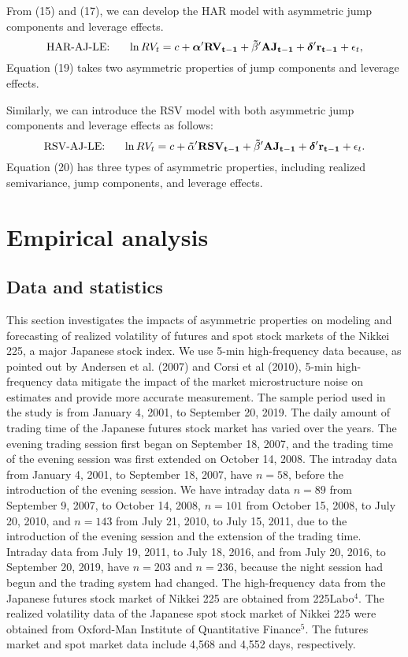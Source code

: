 \documentclass[10pt]{article}
\begin{document}
From (15) and (17), we can develop the HAR model with asymmetric jump components and leverage effects. 
\begin{equation}
\text{HAR-AJ-LE:} \ \ \ \ \ \ln RV_t=c+{\boldsymbol  \alpha}^{\prime} {\bf RV_{t-1}} +{\boldsymbol \tilde{\beta}}^{\prime} {\bf AJ_{t-1}} + {\boldsymbol  \delta}^{\prime} {\bf r_{t-1}} +\epsilon_t,
\end{equation}
Equation (19) takes two asymmetric properties of jump components and leverage effects.

Similarly, we can introduce the RSV model with both asymmetric jump components and leverage effects as follows: 
\begin{equation}
\text{RSV-AJ-LE:} \ \ \ \ \ \ln RV_t=c+{\boldsymbol  \tilde{\alpha}}^{\prime} {\bf RSV_{t-1}} + {\boldsymbol  \tilde{\beta}}^{\prime} {\bf AJ_{t-1}}+{\boldsymbol  \delta}^{\prime} {\bf r_{t-1}} +\epsilon_t. 
\end{equation}
Equation (20) has three types of asymmetric properties, including realized semivariance, jump components, and leverage effects. 


\section{Empirical analysis}

\subsection{Data and statistics}
This section investigates the impacts of asymmetric properties on modeling and forecasting of realized volatility of futures and spot stock markets of the Nikkei 225, a major Japanese stock index. 
We use 5-min high-frequency data 
because, as pointed out by Andersen et al. (2007) and Corsi et al (2010), 5-min high-frequency data mitigate the impact of the market microstructure noise on estimates 
and provide more accurate measurement. 
The sample period used in the study is from January 4, 2001, to September 20, 2019. 
The daily amount of trading time of the Japanese futures stock market has varied over the years. 
The evening trading session first began on September 18, 2007, and the trading time of the evening session was first extended on October 14, 2008. 
The intraday data from January 4, 2001, to September 18, 2007, have $n=58$, before the introduction of the evening session. 
We have intraday data $n=89$ from September 9, 2007, to October 14, 2008, $n=101$ from October 15, 2008, to July 20, 2010,  
and $n=143$ from July 21, 2010, to July 15, 2011, due to the introduction of the evening session and the extension of the trading time. 
Intraday data from July 19, 2011, to July 18, 2016, and from July 20, 2016, to September 20, 2019, have $n=203$ and $n=236$, 
because the night session had begun and the trading system had changed. 
The high-frequency data from the Japanese futures stock market of Nikkei 225 are obtained from 225Labo$^{4}$.
The realized volatility data of the Japanese spot stock market of Nikkei 225 were obtained from Oxford-Man Institute of Quantitative Finance$^{5}$. 
The futures market and spot market data include 4,568 and 4,552 days, respectively. 
\end{document}

